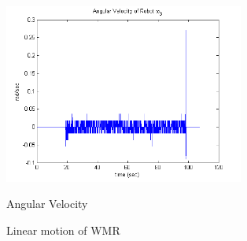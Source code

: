 \begin{figure}
\begin{minipage}[t]{0.5\textwidth}
		\centering
		\includegraphics[width=3.1in]{Chapter5/fig/linOmega} 
		\caption{Angular Velocity}\label{fig:linOmega}
	\end{minipage}
	\caption{Linear motion of  WMR}
\end{figure}

